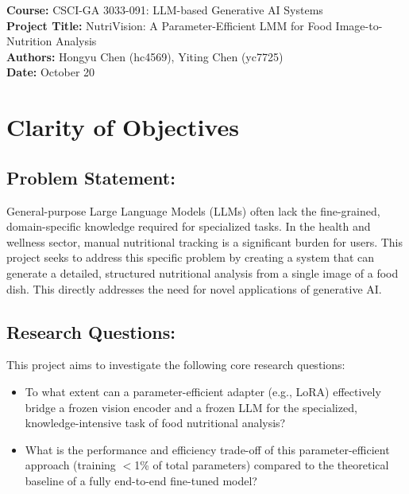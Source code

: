 \documentclass{article}
\begin{document}
\begin{center}
    {\Large \textbf{Course:} CSCI-GA 3033-091: LLM-based Generative AI Systems} \\[0.8em]
    {\Large \textbf{Project Title:} NutriVision: A Parameter-Efficient LMM for Food Image-to-Nutrition Analysis} \\[1em]
    {\large \textbf{Authors:} Hongyu Chen (hc4569), Yiting Chen (yc7725)} \\ [0.8em]
    {\large \textbf{Date:} October 20}
\end{center}

\vspace{1em}



\section{Clarity of Objectives}
\subsection{Problem Statement:} General-purpose Large Language Models (LLMs) often lack the fine-grained, domain-specific knowledge required for specialized tasks. In the health and wellness sector, manual nutritional tracking is a significant burden for users. This project seeks to address this specific problem by creating a system that can generate a detailed, structured nutritional analysis from a single image of a food dish. This directly addresses the need for novel applications of generative AI.

\subsection{Research Questions: }
This project aims to investigate the following core research questions:
\begin{itemize}
    \item To what extent can a parameter-efficient adapter (e.g., LoRA) effectively bridge a frozen vision encoder and a frozen LLM for the specialized, knowledge-intensive task of food nutritional analysis?
    \item What is the performance and efficiency trade-off of this parameter-efficient approach (training $<$1\% of total parameters) compared to the theoretical baseline of a fully end-to-end fine-tuned model?
\end{itemize}
\end{document}
